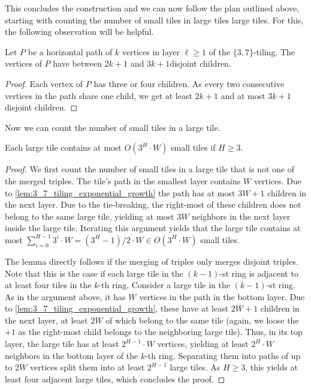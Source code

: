 \documentclass[a4paper,english,cleveref,thm-restate]{lipics-v2021}
\begin{document}
This concludes the construction and we can now follow the plan outlined above, starting with counting the number of small tiles in large tiles large tiles.
For this, the following observation will be helpful.

\begin{lemma}
    \label{lem:3_7_tiling_exponential_growth}
    Let $P$ be a horizontal path of $k$ vertices in layer $\ell \ge 1$ of the $\{3, 7\}$-tiling.
    The vertices of $P$ have between $2k + 1$ and $3k + 1$disjoint children.
\end{lemma}
\begin{proof}
    Each vertex of $P$ has three or four children.
    As every two consecutive vertices in the path share one child, we get at least $2k + 1$ and at most $3k + 1$ disjoint children.
\end{proof}

Now we can count the number of small tiles in a large tile.

\begin{lemma}
    \label{lem:tiling_large_r_count_small_tiles}
    Each large tile contains at most $O(3^H \cdot W)$ small tiles if $H \ge 3$.
\end{lemma}
\begin{proof}
    We first count the number of small tiles in a large tile that is not one of the merged triples.
    The tile's path in the smallest layer contains $W$ vertices.
    Due to \cref{lem:3_7_tiling_exponential_growth} the path has at most $3W + 1$ children in the next layer.
    Due to the tie-breaking, the right-most of these children does not belong to the same large tile, yielding at most $3W$ neighbors in the next layer inside the large tile.
    Iterating this argument yields that the large tile contains at most $\sum_{i = 0}^{H - 1} 3^i \cdot W = (3^H - 1) / 2 \cdot W \in O(3^H \cdot W)$ small tiles.

    The lemma directly follows if the merging of triples only merges disjoint triples.
    Note that this is the case if each large tile in the $(k - 1)$-st ring is adjacent to at least four tiles in the $k$-th ring.
    Consider a large tile in the $(k - 1)$-st ring.
    As in the argument above, it has $W$ vertices in the path in the bottom layer.
    Due to \cref{lem:3_7_tiling_exponential_growth}, these have at least $2W + 1$ children in the next layer, at least $2W$ of which belong to the same tile (again, we loose the $+1$ as the right-most child belongs to the neighboring large tile).
    Thus, in its top layer, the large tile has at least $2^{H - 1}\cdot W$ vertices, yielding at least $2^H \cdot W$ neighbors in the bottom layer of the $k$-th ring.
    Separating them into paths of up to $2W$ vertices split them into at least $2^{H - 1}$ large tiles.
    As $H \ge 3$, this yields at least four adjacent large tiles, which concludes the proof.
\end{proof}
\end{document}
